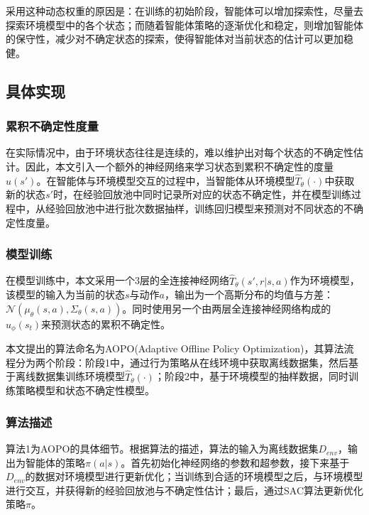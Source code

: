 \documentclass{article}
\begin{document}
采用这种动态权重的原因是：在训练的初始阶段，智能体可以增加探索性，尽量去探索环境模型中的各个状态；而随着智能体策略的逐渐优化和稳定，则增加智能体的保守性，减少对不确定状态的探索，使得智能体对当前状态的估计可以更加稳健。

\subsection{具体实现}
\subsubsection{累积不确定性度量}
在实际情况中，由于环境状态往往是连续的，难以维护出对每个状态的不确定性估计。因此，本文引入一个额外的神经网络来学习状态到累积不确定性的度量$u(s')$。在智能体与环境模型交互的过程中，当智能体从环境模型$\hat{T}_{\theta}(\cdot)$中获取新的状态$s'$时，在经验回放池中同时记录所对应的状态不确定性，并在模型训练过程中，从经验回放池中进行批次数据抽样，训练回归模型来预测对不同状态的不确定性度量。

\subsubsection{模型训练}
在模型训练中，本文采用一个3层的全连接神经网络$\hat{T}_{\theta}(s', r | s, a)$作为环境模型，该模型的输入为当前的状态$s$与动作$a$，输出为一个高斯分布的均值与方差：$\mathcal{N}\left( \mu_{\theta}(s, a), \Sigma_{\theta}(s, a) \right)$。同时使用另一个由两层全连接神经网络构成的$u_{\phi}(s_t)$来预测状态的累积不确定性。

本文提出的算法命名为AOPO(Adaptive Offline Policy Optimization)，其算法流程分为两个阶段：阶段1中，通过行为策略从在线环境中获取离线数据集，然后基于离线数据集训练环境模型$\hat{T}_{\theta}(\cdot)$；阶段2中，基于环境模型的抽样数据，同时训练策略模型和状态不确定性模型。

\subsubsection{算法描述}
算法1为AOPO的具体细节。根据算法的描述，算法的输入为离线数据集$D_{env}$，输出为智能体的策略$\pi(a | s)$。首先初始化神经网络的参数和超参数，接下来基于$D_{env}$的数据对环境模型进行更新优化；当训练到合适的环境模型之后，与环境模型进行交互，并获得新的经验回放池与不确定性估计；最后，通过SAC算法更新优化策略$\pi$。
\end{document}
